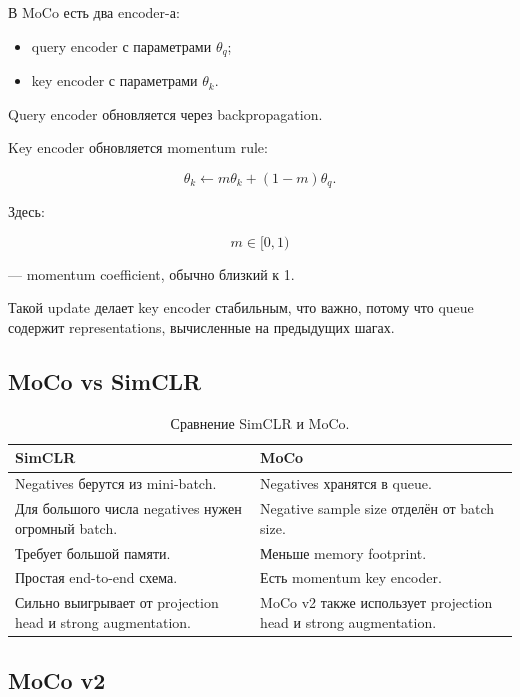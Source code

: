 \documentclass[a4paper,12pt]{article}
\begin{document}
В MoCo есть два encoder-а:

\begin{itemize}
    \item query encoder с параметрами \(\theta_q\);
    \item key encoder с параметрами \(\theta_k\).
\end{itemize}

Query encoder обновляется через backpropagation.

Key encoder обновляется momentum rule:

\[
\theta_k
\leftarrow
m\theta_k + (1-m)\theta_q.
\]

Здесь:

\[
m \in [0,1)
\]

--- momentum coefficient, обычно близкий к 1.

Такой update делает key encoder стабильным, что важно, потому что queue содержит representations, вычисленные на предыдущих шагах.

\subsection{MoCo vs SimCLR}

\begin{table}[H]
\centering
\begin{tabular}{p{} p{}}
\toprule
\textbf{SimCLR} & \textbf{MoCo} \\
\midrule
Negatives берутся из mini-batch. &
Negatives хранятся в queue. \\

Для большого числа negatives нужен огромный batch. &
Negative sample size отделён от batch size. \\

Требует большой памяти. &
Меньше memory footprint. \\

Простая end-to-end схема. &
Есть momentum key encoder. \\

Сильно выигрывает от projection head и strong augmentation. &
MoCo v2 также использует projection head и strong augmentation. \\
\bottomrule
\end{tabular}
\caption{Сравнение SimCLR и MoCo.}
\end{table}

\subsection{MoCo v2}
\end{document}
